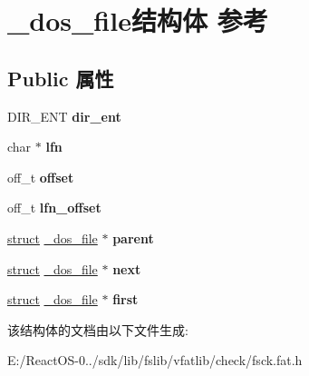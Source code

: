 \hypertarget{struct__dos__file}{}\section{\+\_\+dos\+\_\+file结构体 参考}
\label{struct__dos__file}
\subsection*{Public 属性}
\begin{DoxyCompactItemize}
\item 
\mbox{\label{struct__dos__file_a5b10135b75fb5b39afb59a93d7c0d722}} 
D\+I\+R\+\_\+\+E\+NT {\bfseries dir\+\_\+ent}
\item 
\mbox{\label{struct__dos__file_af34779fd1d25931051a53a9e5d8df70f}} 
char $\ast$ {\bfseries lfn}
\item 
\mbox{\label{struct__dos__file_a5d06802e546ab33ff298c4691b544dbf}} 
off\+\_\+t {\bfseries offset}
\item 
\mbox{\label{struct__dos__file_a6d2f7e6e602ac4d98d7966a92a954d91}} 
off\+\_\+t {\bfseries lfn\+\_\+offset}
\item 
\mbox{\label{struct__dos__file_a3851f0315b46ee7665175473435801c1}} 
\hyperlink{interfacestruct}{struct} \hyperlink{struct__dos__file}{\+\_\+dos\+\_\+file} $\ast$ {\bfseries parent}
\item 
\mbox{\label{struct__dos__file_a13ac89f7701a45d8b9556288a67cec4b}} 
\hyperlink{interfacestruct}{struct} \hyperlink{struct__dos__file}{\+\_\+dos\+\_\+file} $\ast$ {\bfseries next}
\item 
\mbox{\label{struct__dos__file_afbf2ce7c89f30204b9235b1d63b1fa7d}} 
\hyperlink{interfacestruct}{struct} \hyperlink{struct__dos__file}{\+\_\+dos\+\_\+file} $\ast$ {\bfseries first}
\end{DoxyCompactItemize}


该结构体的文档由以下文件生成\+:\begin{DoxyCompactItemize}
\item 
E\+:/\+React\+O\+S-\/0../sdk/lib/fslib/vfatlib/check/fsck.\+fat.\+h\end{DoxyCompactItemize}
